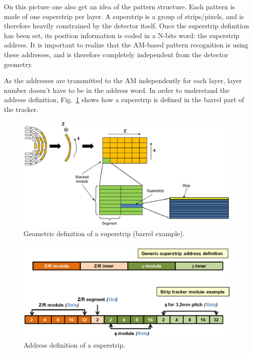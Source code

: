 \noindent On this picture one also get an idea of the pattern structure. Each pattern is made of one superstrip per layer. A superstrip is a group of strips/pixels, and is therefore heavily constrained by the detector itself. Once the superstrip definition has been set, its position information is coded in a N-bits word: the superstrip address. It is important to realize that the AM-based pattern recognition is using these addresses, and is therefore completely independent from the detector geometry.

\noindent As the addresses are transmitted to the AM independently for each layer, layer number doesn't have to be in the address word. In order to understand the address definition, Fig.~\ref{fig:sstrip_def} shows how a superstrip is defined in the barrel part of the tracker.  
\begin{figure}[ht!]
\centering
\includegraphics[width=0.7\columnwidth]{Plots/SStripDef.eps}
\caption{Geometric definition of a superstrip (barrel example).}
\label{fig:sstrip_def}
\end{figure}
\begin{figure}[ht!]
\centering
\includegraphics[width=0.7\columnwidth]{Plots/SSaddress.eps}
\caption{Address definition of a superstrip.}
\label{fig:SS_code}
\end{figure}

